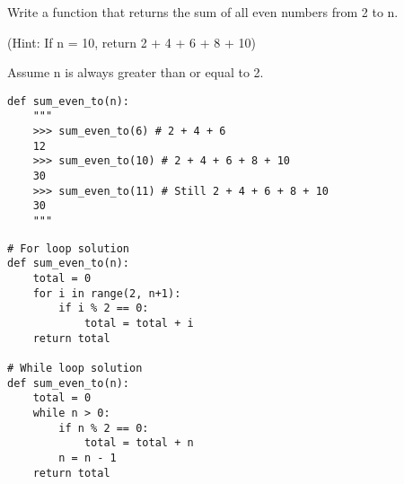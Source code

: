 \begin{blocksection}
\question Write a function that returns the sum of all even numbers from 2 to n. 

(Hint: If n = 10, return 2 + 4 + 6 + 8 + 10)

Assume n is always greater than or equal to 2.

\begin{lstlisting}
def sum_even_to(n): 
    """
    >>> sum_even_to(6) # 2 + 4 + 6
    12
    >>> sum_even_to(10) # 2 + 4 + 6 + 8 + 10
    30
    >>> sum_even_to(11) # Still 2 + 4 + 6 + 8 + 10
    30
    """

\end{lstlisting}

\begin{solution}[1.5in]
\begin{lstlisting}
# For loop solution
def sum_even_to(n): 
    total = 0
    for i in range(2, n+1):
        if i % 2 == 0:
            total = total + i
    return total

# While loop solution
def sum_even_to(n): 
    total = 0
    while n > 0:
        if n % 2 == 0:
            total = total + n
        n = n - 1
    return total
\end{lstlisting}
\end{solution}
\end{blocksection}
